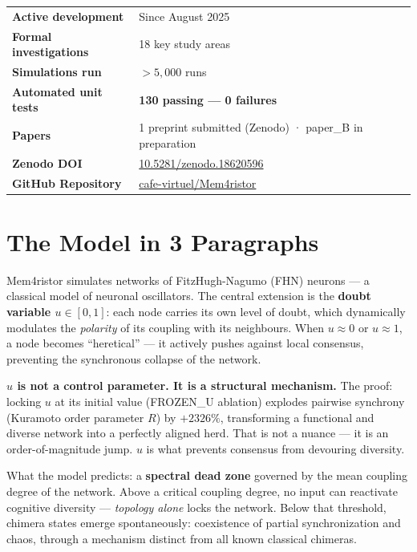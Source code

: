 \documentclass[11pt, a4paper]{article}
\newcommand{\result}[1]{\textbf{\color{positive}#1}}
\newcommand{\kw}[1]{\textbf{#1}}
\begin{document}
\begin{center}
\renewcommand{\arraystretch}{1.25}
\begin{tabular}{p{4.5cm} p{9cm}}
\toprule
\textbf{Active development} & Since August 2025 \\
\textbf{Formal investigations} & 18 key study areas \\
\textbf{Simulations run} & $> 5{,}000$ runs \\
\textbf{Automated unit tests} & \result{130 passing --- 0 failures} \\
\textbf{Papers} & 1 preprint submitted (Zenodo) · paper\_B in preparation \\
\textbf{Zenodo DOI} & \href{https://doi.org/10.5281/zenodo.18620596}{10.5281/zenodo.18620596} \\
\textbf{GitHub Repository} & \href{https://github.com/cafe-virtuel/Mem4ristor}{cafe-virtuel/Mem4ristor} \\
\bottomrule
\end{tabular}
\end{center}

\section{The Model in 3 Paragraphs}

Mem4ristor simulates networks of FitzHugh-Nagumo (FHN) neurons --- a classical model of neuronal
oscillators. The central extension is the \kw{doubt variable $u \in [0,1]$}: each node carries its
own level of doubt, which dynamically modulates the \textit{polarity} of its coupling with its
neighbours. When $u \approx 0$ or $u \approx 1$, a node becomes ``heretical'' --- it actively
pushes against local consensus, preventing the synchronous collapse of the network.

\kw{$u$ is not a control parameter. It is a structural mechanism.} The proof: locking $u$ at its initial
value (FROZEN\_U ablation) explodes pairwise synchrony (Kuramoto order parameter $R$) by \result{$+2326\%$}, transforming a functional and
diverse network into a perfectly aligned herd. That is not a nuance --- it is an order-of-magnitude
jump. $u$ is what prevents consensus from devouring diversity.

What the model predicts: a \kw{spectral dead zone} governed by the mean coupling degree of the network. Above a critical coupling degree, no input can reactivate cognitive diversity --- \textit{topology alone} locks the network. Below that threshold, chimera states emerge spontaneously: coexistence of partial synchronization and chaos, through a mechanism distinct from all known classical chimeras.
\end{document}
